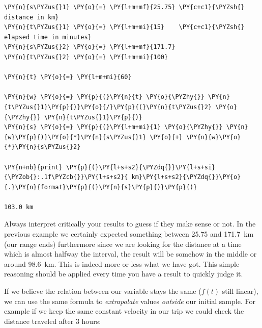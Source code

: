 \begin{codebox}
\begin{Verbatim}[commandchars=\\\{\}]
\PY{n}{s\PYZus{}1} \PY{o}{=} \PY{l+m+mf}{25.75} \PY{c+c1}{\PYZsh{} distance in km}
\PY{n}{t\PYZus{}1} \PY{o}{=} \PY{l+m+mi}{15}    \PY{c+c1}{\PYZsh{} elapsed time in minutes}
\PY{n}{s\PYZus{}2} \PY{o}{=} \PY{l+m+mf}{171.7}
\PY{n}{t\PYZus{}2} \PY{o}{=} \PY{l+m+mi}{100}

\PY{n}{t} \PY{o}{=} \PY{l+m+mi}{60}

\PY{n}{w} \PY{o}{=} \PY{p}{(}\PY{n}{t} \PY{o}{\PYZhy{}} \PY{n}{t\PYZus{}1}\PY{p}{)}\PY{o}{/}\PY{p}{(}\PY{n}{t\PYZus{}2} \PY{o}{\PYZhy{}} \PY{n}{t\PYZus{}1}\PY{p}{)}
\PY{n}{s} \PY{o}{=} \PY{p}{(}\PY{l+m+mi}{1} \PY{o}{\PYZhy{}} \PY{n}{w}\PY{p}{)}\PY{o}{*}\PY{n}{s\PYZus{}1} \PY{o}{+} \PY{n}{w}\PY{o}{*}\PY{n}{s\PYZus{}2}

\PY{n+nb}{print} \PY{p}{(}\PY{l+s+s2}{\PYZdq{}}\PY{l+s+si}{\PYZob{}:.1f\PYZcb{}}\PY{l+s+s2}{ km}\PY{l+s+s2}{\PYZdq{}}\PY{o}{.}\PY{n}{format}\PY{p}{(}\PY{n}{s}\PY{p}{)}\PY{p}{)}

103.0 km
\end{Verbatim}
\end{codebox}

Always interpret critically your results to guess if they make sense or not. In the previous example we certainly expected something between 25.75 and 171.7~km (our range ends) furthermore since we are looking for the distance at a time which is almost halfway the interval, the result will be somehow in the middle or around 98.6~km. This is indeed more or less what we have got.
This simple reasoning should be applied every time you have a result to quickly judge it.

If we believe the relation between our variable stays the same ($f(t)$ still linear), we can use the same formula to \emph{extrapolate} values \emph{outside} our initial sample. For example if we keep the same constant velocity in our trip we could check the distance traveled after 3 hours:

